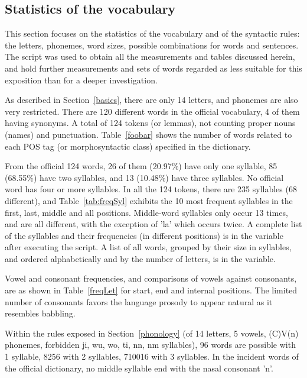 \subsection{Statistics of the vocabulary}\label{sec:stat}
This section focuses on the statistics of the vocabulary
and of the syntactic rules:
the letters, phonemes, word sizes,
possible combinations for words and sentences.
The script 
was used to obtain all the measurements and tables
discussed herein,
and hold further measurements and sets of words
regarded as less suitable for this exposition than
for a deeper investigation.

As described in Section~\ref{basics},
there are only 14 letters,
and phonemes are also very restricted.
There are 120 different words in the official vocabulary,
4 of them having synonyms.
A total of 124 tokens (or lemmas),
not counting proper nouns (names)
and punctuation.
Table~\ref{foobar} shows the number of words
related to each POS tag (or morphosyntactic class)
specified in the dictionary.



From the official 124 words, 
26 of them (20.97\%)
have only one syllable,
85 (68.55\%) have two syllables,
and 13 (10.48\%) have three syllables.
No official word has four or more syllables.
In all the 124 tokens, there are 235 syllables (68 different),
and Table~\ref{tab:freqSyl} exhibits the 10 most frequent
syllables in the first, last, middle and all positions.
Middle-word syllables only occur 13 times,
and are all different, with the exception of 'la'
which occurs twice.
A complete list of the syllables and their frequencies (in different
positions) is in the  variable after executing the 
script.
A list of all words, grouped by their size in syllables,
and ordered alphabetically and by the number of letters,
is in the  variable.



Vowel and consonant frequencies,
and comparisons of vowels against consonants,
are as shown in Table~\ref{freqLet}
for start, end and internal positions.
The limited number of consonants favors
the language prosody to appear natural
as it resembles babbling.



Within the rules exposed in Section~\ref{phonology}
(of 14 letters, 5 vowels, (C)V(n) phonemes,
forbidden ji, wu, wo, ti, nn, nm syllables),
96 words are possible with 1 syllable,
8256 with 2 syllables, 710016 with 3 syllables.
In the incident words of the official dictionary,
no middle syllable end with the nasal consonant 'n'.

